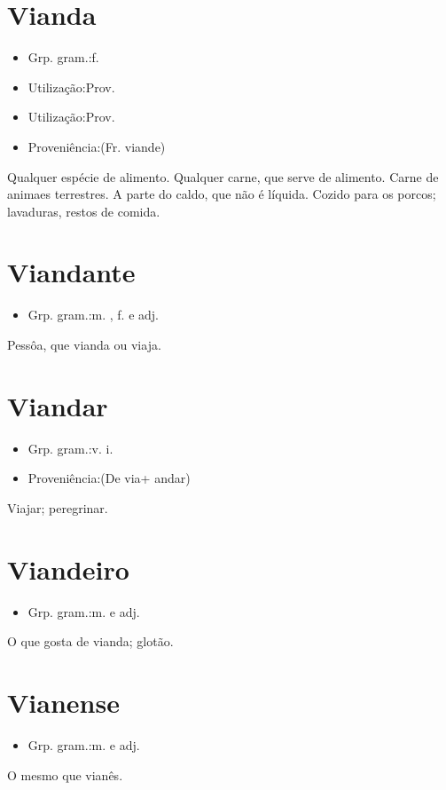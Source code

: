 \documentclass{article}
\begin{document}
\section{Vianda}
\begin{itemize}
\item {Grp. gram.:f.}
\end{itemize}
\begin{itemize}
\item {Utilização:Prov.}
\end{itemize}
\begin{itemize}
\item {Utilização:Prov.}
\end{itemize}
\begin{itemize}
\item {Proveniência:(Fr. \textunderscore viande\textunderscore )}
\end{itemize}
Qualquer espécie de alimento.
Qualquer carne, que serve de alimento.
Carne de animaes terrestres.
A parte do caldo, que não é líquida.
Cozido para os porcos; lavaduras, restos de comida.
\section{Viandante}
\begin{itemize}
\item {Grp. gram.:m. ,  f.  e  adj.}
\end{itemize}
Pessôa, que vianda ou viaja.
\section{Viandar}
\begin{itemize}
\item {Grp. gram.:v. i.}
\end{itemize}
\begin{itemize}
\item {Proveniência:(De \textunderscore via\textunderscore  + \textunderscore andar\textunderscore )}
\end{itemize}
Viajar; peregrinar.
\section{Viandeiro}
\begin{itemize}
\item {Grp. gram.:m.  e  adj.}
\end{itemize}
O que gosta de vianda; glotão.
\section{Vianense}
\begin{itemize}
\item {Grp. gram.:m.  e  adj.}
\end{itemize}
O mesmo que \textunderscore vianês\textunderscore .
\end{document}
